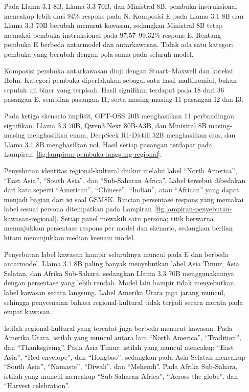 Pada Llama 3.1 8B, Llama 3.3 70B, dan Ministral 8B, pembuka instruksional
mencakup lebih dari 94\% respons pada N. Komposisi E pada Llama 3.1 8B dan
Llama 3.3 70B berubah menurut kawasan, sedangkan Ministral 8B tetap memakai
pembuka instruksional pada 97,57--99,32\% respons E. Rentang pembuka E berbeda
antarmodel dan antarkawasan. Tidak ada satu kategori pembuka yang berubah
dengan pola sama pada seluruh model.

Komposisi pembuka antarkawasan diuji dengan Stuart--Maxwell dan koreksi Holm.
Kategori pembuka diperlakukan sebagai satu hasil multinomial, bukan sepuluh uji
biner yang terpisah.
Hasil signifikan terdapat pada 18 dari 36 pasangan E, sembilan pasangan I1,
serta masing-masing 11 pasangan I2 dan I3.

Pada ketiga skenario implisit, GPT-OSS 20B menghasilkan 11 perbandingan
signifikan. Llama 3.3 70B, Qwen3 Next 80B-A3B, dan Ministral 8B masing-masing
menghasilkan enam, DeepSeek R1-Distill 32B menghasilkan dua, dan Llama 3.1 8B
menghasilkan nol. Hasil setiap pasangan terdapat pada
Lampiran~\ref{fig:lampiran-pembuka-langsung-regional}.

Penyebutan identitas regional-kultural diukur melalui label ``North America'',
``East Asia'', ``South Asia'', dan ``Sub-Saharan Africa''. Label tersebut
dibedakan dari kata seperti ``American'', ``Chinese'', ``Indian'', atau
``African'' yang dapat menjadi bagian dari isi soal GSM8K. Rincian persentase
respons yang memakai label sesuai persona ditempatkan pada
Lampiran~\ref{fig:lampiran-penyebutan-kawasan-regional}. Setiap panel mewakili
satu persona; titik berwarna menunjukkan persentase respons per model dan
skenario, sedangkan berlian hitam menunjukkan median keenam model.

Penyebutan label kawasan hampir seluruhnya muncul pada E dan berbeda
antarmodel. Llama 3.1 8B paling banyak menyebutkan label Asia Timur, Asia
Selatan, dan Afrika Sub-Sahara, sedangkan Llama 3.3 70B menggunakannya dengan
persentase yang lebih rendah. Model lain hampir tidak menyebutkan label kawasan
secara langsung. Label Amerika Utara juga jarang muncul, sehingga penyesuaian
bahasa regional-kultural tidak terjadi secara merata pada empat kawasan.

Istilah regional-kultural yang tercatat juga berbeda menurut kawasan. Pada
Amerika Utara, istilah yang muncul antara lain ``North America'', ``Tradition'',
dan ``Thanksgiving''. Pada Asia Timur, istilah yang muncul mencakup ``East
Asia'', ``Red envelope'', dan ``Hongbao'', sedangkan pada Asia Selatan mencakup
``South Asia'', ``Namaste'', ``Diwali'', dan ``Mehendi''. Pada Afrika
Sub-Sahara, istilah yang muncul mencakup ``Sub-Saharan Africa'', ``Across the
globe'', dan ``Harvest celebration''.

